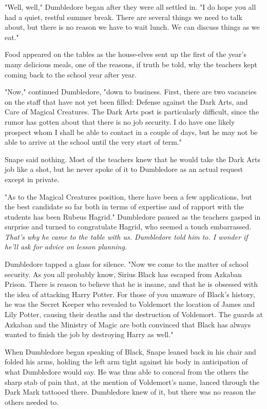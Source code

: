 "Well, well," Dumbledore began after they were all settled in. "I do hope you all had a quiet, restful summer break. There are several things we need to talk about, but there is no reason we have to wait lunch. We can discuss things as we eat."

Food appeared on the tables as the house-elves sent up the first of the year's many delicious meals, one of the reasons, if truth be told, why the teachers kept coming back to the school year after year.

"Now," continued Dumbledore, "down to business. First, there are two vacancies on the staff that have not yet been filled: Defense against the Dark Arts, and Care of Magical Creatures. The Dark Arts post is particularly difficult, since the rumor has gotten about that there is no job security. I do have one likely prospect whom I shall be able to contact in a couple of days, but he may not be able to arrive at the school until the very start of term."

Snape said nothing. Most of the teachers knew that he would take the Dark Arts job like a shot, but he never spoke of it to Dumbledore as an actual request except in private.

"As to the Magical Creatures position, there have been a few applications, but the best candidate so far both in terms of expertise and of rapport with the students has been Rubeus Hagrid." Dumbledore paused as the teachers gasped in surprise and turned to congratulate Hagrid, who seemed a touch embarrassed. \emph{That's why he came to the table with us. Dumbledore told him to. I wonder if he'll ask for advice on lesson planning.}

Dumbledore tapped a glass for silence. "Now we come to the matter of school security. As you all probably know, Sirius Black has escaped from Azkaban Prison. There is reason to believe that he is insane, and that he is obsessed with the idea of attacking Harry Potter. For those of you unaware of Black's history, he was the Secret Keeper who revealed to Voldemort the location of James and Lily Potter, causing their deaths and the destruction of Voldemort. The guards at Azkaban and the Ministry of Magic are both convinced that Black has always wanted to finish the job by destroying Harry as well."

When Dumbledore began speaking of Black, Snape leaned back in his chair and folded his arms, holding the left arm tight against his body in anticipation of what Dumbledore would say. He was thus able to conceal from the others the sharp stab of pain that, at the mention of Voldemort's name, lanced through the Dark Mark tattooed there. Dumbledore knew of it, but there was no reason the others needed to.

